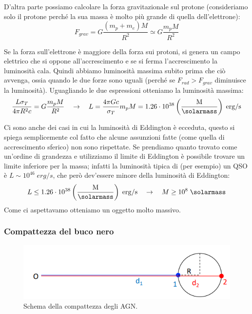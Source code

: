 D’altra parte possiamo calcolare la forza gravitazionale sul protone (consideriamo solo il protone perché la sua massa è molto più grande di quella dell'elettrone):
\begin{equation*}
    F_{grav} = G\frac{(m_p+m_e)M}{R^2} \simeq G\frac{m_pM}{R^2}
\end{equation*}

Se la forza sull’elettrone è maggiore della forza sui protoni, si genera un campo elettrico che si oppone all’accrescimento e se si ferma l’accrescimento la luminosità cala. Quindi abbiamo luminosità massima subito prima che ciò avvenga, ossia quando le due forze sono uguali (perché se $F_{rad} > F_{grav}$ diminuisce la luminosità). Uguagliando le due espressioni otteniamo la luminosità massima:
\begin{equation*}
    \frac{L\sigma_T}{4\pi R^2 c} =  G\frac{m_pM}{R^2} \quad \rightarrow \quad L = \frac{4\pi G c}{\sigma_T}m_pM = 1.26\cdot 10^{38} \left(\frac{\textup{M}}{\si{\solarmass}}\right)\;\si{erg}/\si{s}
\end{equation*}

Ci sono anche dei casi in cui la luminosità di Eddington è ecceduta, questo si spiega semplicemente col fatto che alcune assunzioni fatte (come quella di accrescimento sferico) non sono rispettate. Se prendiamo quanto trovato come un'ordine di grandezza e utilizziamo il limite di Eddington è possibile trovare un limite inferiore per la massa; infatti la luminosità tipica di (per esempio) un QSO è $L\sim 10^{46} \;\si{erg}/\si{s}$, che però dev'essere minore della luminosità di Eddington:
\begin{equation*}
    L \leq 1.26\cdot 10^{38} \left(\frac{\textup{M}}{\si{\solarmass}}\right)\;\si{erg}/\si{s} \quad \rightarrow \quad M \geq 10^8 \;\si{\solarmass}
\end{equation*}
Come ci aspettavamo otteniamo un oggetto molto massivo. 

\subsubsection{Compattezza del buco nero}

\begin{figure}
    \centering
    \includegraphics[width = 0.7 \textwidth]{immagini/compattezza-agn.png}
    \caption{Schema della compattezza degli AGN.}
    \label{fig:compattezza-agn}
\end{figure}

